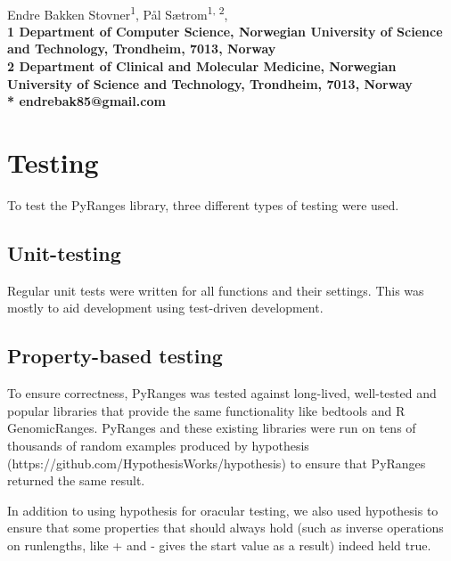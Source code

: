 \documentclass[10pt,letterpaper]{article}
\begin{document}
\vspace*{0.35in}

\begin{flushleft}
{\Large
  \textbf{}
}
\newline
\\
Endre Bakken Stovner\textsuperscript{1},
Pål Sætrom\textsuperscript{1, 2},
\\
\bf{1} Department of
  Computer Science, Norwegian University
  of Science and Technology, Trondheim, 7013, Norway
\\
\bf{2} Department of Clinical and Molecular Medicine, Norwegian
  University of Science and Technology, Trondheim, 7013, Norway
\\
\bigskip
* endrebak85@gmail.com

\end{flushleft}

\section*{Testing}

To test the PyRanges library, three different types of testing were used.

\subsection*{Unit-testing}

Regular unit tests were written for all functions and their settings. This was
mostly to aid development using test-driven development.

\subsection*{Property-based testing}

To ensure correctness, PyRanges was tested against long-lived, well-tested and
popular libraries that provide the same functionality like bedtools and R
GenomicRanges. PyRanges and these existing libraries were run on tens of
thousands of random examples produced by hypothesis
(https://github.com/HypothesisWorks/hypothesis) to ensure that PyRanges returned
the same result.

In addition to using hypothesis for oracular testing, we also used hypothesis to
ensure that some properties that should always hold (such as inverse operations
on runlengths, like + and - gives the start value as a result) indeed held true.
\end{document}
